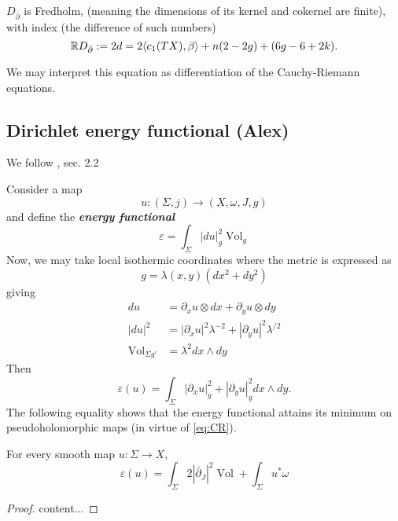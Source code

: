 $D_{\bar\partial}$ is Fredholm, (meaning the dimensions of its kernel and cokernel are finite), with index (the difference of such numbers)
\[\index_\mathbb{R} D_{\bar\partial}:=2d=2\langle c_1(TX),\beta\rangle+n(2-2g)+(6g-6+2k).\]

We may interpret this equation as differentiation of the Cauchy-Riemann equations.

\subsection{Dirichlet energy functional (Alex)}
	We follow \cite{mcduff}, sec. 2.2
	
	Consider a map
	\[u:(\Sigma,j)\to(X,\omega,J,g)\]
	and define the \textbf{\textit{energy functional}}
	\[\varepsilon=\int_\Sigma|du|^2_g\operatorname{Vol}_g\]
	Now, we may take local isothermic coordinates where the metric is expressed as
	\[g=\lambda(x,y)(dx^2+dy^2)\]
	giving
	\begin{align*}
		du&=\partial_xu\otimes dx+\partial_yu\otimes dy\\
		|du|^2&=|\partial_xu|^2\lambda^{-2}+|\partial_yu|^2\lambda^{/2}\\
		\operatorname{Vol}_{\Sigma g'}&=\lambda^2dx\wedge dy
	\end{align*}
	Then
	\[\varepsilon(u)=\int_\Sigma|\partial_xu|^2_g+|\partial_yu|_g^2dx\wedge dy.\]
	The following equality shows that the energy functional attains its minimum on pseudoholomorphic maps (in virtue of \cref{eq:CR}).
	\begin{claim}
		For every smooth map $u:\Sigma\to X$,
	\[\varepsilon(u)=\int_\Sigma2|\bar\partial_J|^2\operatorname{Vol}+\int_\Sigma u^*\omega\]
	\end{claim}
	\begin{proof}
		content...
	\end{proof}

